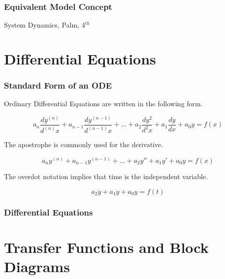 \documentclass{beamer}                  %
\newcommand{\sectiontitleI}{Equivalent Model Concept} %
\newcommand{\sectiontitleII}{Differential Equations}
\newcommand{\sectiontitleIII}{Transfer Functions and Block Diagrams}
\begin{document}
	
	\begin{frame}[label=sectionI] \small
		\frametitle{\sectiontitleI}
		

		\btVFill
		\tiny{System Dynamics, Palm, 4$^{th}$}		
		
	\end{frame}

\section{\sectiontitleII}

	\begin{frame}[label=sectionII,containsverbatim] \small
	
		\frametitle{Standard Form of an ODE}

		Ordinary Differential Equations are written in the following form.\vspace{1mm}

		\[a_n\frac{dy^{(n)}}{d^{(n)}x}+a_{n-1}\frac{dy^{(n-1)}}{d^{(n-1)}x}+...+a_{2}\frac{dy^{2}}{d^{2}x}+a_{1}\frac{dy}{dx}+a_0y=f(x)\] \vspace{1mm}		

		The apostrophe is commonly used for the derivative. \vspace{1mm}

		\[a_ny^{(n)}+a_{n-1}y^{(n-1)}+...+a_2y'' +a_1y'+a_0y=f(x)\] \vspace{1mm}

		The overdot notation implies that time is the independent variable. \vspace{1mm}

		\[a_2\ddot{y} +a_1\dot{y}+a_0y=f(t)\] \vspace{1mm}

	\end{frame}

	\begin{frame} \small
		\frametitle{\sectiontitleII}
			
	\end{frame}	

\section{\sectiontitleIII}
\end{document}
